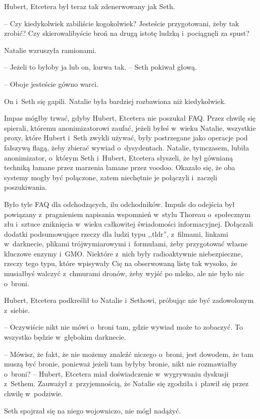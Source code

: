 \documentclass[oneside,polish,11pt,sfheadings]{mwbk}
\begin{document}
Hubert, Etcetera był teraz tak zdenerwowany jak Seth. 

-- Czy kiedykolwiek
zabiliście kogokolwiek? Jesteście przygotowani, żeby tak zrobić? Czy
skierowalibyście broń na drugą istotę ludzką i~pociągnęli za spust?

Natalie wzruszyła ramionami. 

-- Jeżeli to byłoby ja lub on, kurwa tak. -- Seth pokiwał głową.

-- Oboje jesteście gówno warci.

On i~Seth się gapili. Natalie była bardziej rozbawiona niż kiedykolwiek.

Impas mógłby trwać, gdyby Hubert, Etcetera nie poszukał FAQ. Przez
chwilę się spierali, któremu anonimizatorowi zaufać, jeżeli byłeś w~wieku Natalie, wszystkie proxy, które Hubert i~Seth zwykli używać, były
postrzegane jako operacje pod fałszywą flagą, żeby zbierać wywiad o~dysydentach. Natalie, tymczasem, lubiła anonimizator, o~którym Seth i~Hubert, Etcetera słyszeli, że był gównianą techniką łamane przez
marzenia łamane przez voodoo. Okazało się, że oba systemy mogły być
połączone, zatem niechętnie je połączyli i~zaczęli poszukiwania.

Było tyle FAQ dla odchodzących, ilu odchodników. Impuls do odejścia był
powiązany z~pragnieniem napisania wspomnień w~stylu Thoreau o~społecznym
złu i~sztuce zniknięcia w~wieku całkowitej świadomości informacyjnej.
Dołączali dodatki podsumowujące rzeczy dla ludzi typu ,,tldr'', z~filmami, linkami w~darknecie, plikami trójwymiarowymi i~formułami, żeby
przygotować własne kluczowe enzymy i~GMO. Niektóre z~nich były
radioaktywnie niebezpieczne, rzeczy tego typu, które wpisywały Cię na
obserwowaną listę tak wysoko, że musiałbyś walczyć z~chmurami dronów,
żeby wyjść po mleko, ale nie było nic o~broni.

Hubert, Etcetera podkreślił to Natalie i~Sethowi, próbując nie być
zadowolonym z~siebie. 

-- Oczywiście nikt nie mówi o~broni tam, gdzie
wywiad może to zobaczyć. To wszystko będzie w~głębokim darknecie.

-- Mówisz, że fakt, że nie możemy znaleźć niczego o~broni, jest dowodem,
że tam muszą być bronie, ponieważ jeżeli tam byłyby bronie, nikt nie
rozmawiałby o~broni? -- Hubert, Etcetera miał doświadczenie w~wygrywaniu
dyskusji z~Sethem. Zauważył z~przyjemnością, że Natalie się zgodziła i~pławił się przez chwilę w~podziwie.

Seth spojrzał się na niego wojowniczo, nie mógł nadążyć. 
\end{document}
